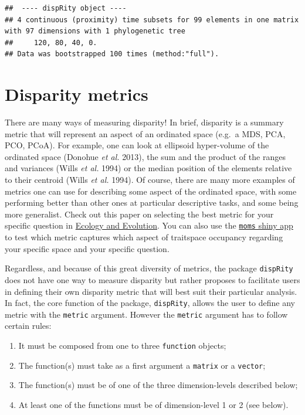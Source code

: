 \documentclass[
]{book}
\providecommand{\tightlist}{%
  \setlength{\itemsep}{0pt}\setlength{\parskip}{0pt}}
\begin{document}
\begin{verbatim}
##  ---- dispRity object ---- 
## 4 continuous (proximity) time subsets for 99 elements in one matrix with 97 dimensions with 1 phylogenetic tree
##     120, 80, 40, 0.
## Data was bootstrapped 100 times (method:"full").
\end{verbatim}

\hypertarget{disparity-metrics}{%
\section{Disparity metrics}\label{disparity-metrics}}

There are many ways of measuring disparity!
In brief, disparity is a summary metric that will represent an aspect of an ordinated space (e.g.~a MDS, PCA, PCO, PCoA).
For example, one can look at ellipsoid hyper-volume of the ordinated space (Donohue \emph{et al.} 2013), the sum and the product of the ranges and variances (Wills \emph{et al.} 1994) or the median position of the elements relative to their centroid (Wills \emph{et al.} 1994).
Of course, there are many more examples of metrics one can use for describing some aspect of the ordinated space, with some performing better than other ones at particular descriptive tasks, and some being more generalist.
Check out this paper on selecting the best metric for your specific question in \href{https://onlinelibrary.wiley.com/doi/full/10.1002/ece3.6452}{Ecology and Evolution}.
You can also use the \href{https://tguillerme.shinyapps.io/moms/}{\texttt{moms} shiny app} to test which metric captures which aspect of traitspace occupancy regarding your specific space and your specific question.

Regardless, and because of this great diversity of metrics, the package \texttt{dispRity} does not have one way to measure disparity but rather proposes to facilitate users in defining their own disparity metric that will best suit their particular analysis.
In fact, the core function of the package, \texttt{dispRity}, allows the user to define any metric with the \texttt{metric} argument.
However the \texttt{metric} argument has to follow certain rules:

\begin{enumerate}
\def\labelenumi{\arabic{enumi}.}
\tightlist
\item
  It must be composed from one to three \texttt{function} objects;
\item
  The function(s) must take as a first argument a \texttt{matrix} or a \texttt{vector};
\item
  The function(s) must be of one of the three dimension-levels described below;
\item
  At least one of the functions must be of dimension-level 1 or 2 (see below).
\end{enumerate}
\end{document}
